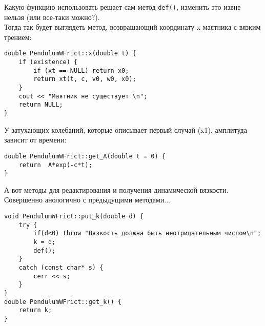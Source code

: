 \documentclass {report}
\begin{document}
Какую функцию использовать решает сам метод \texttt{def()}, изменить это извне нельзя (или все-таки можно?). \\
Тогда так будет выглядеть метод, возвращающий координату x маятника с вязким трением:
\begin{lstlisting}
double PendulumWFrict::x(double t) {
	if (existence) {
		if (xt == NULL) return x0;
		return xt(t, c, v0, w0, x0);
	}
	cout << "Маятник не существует \n";
	return NULL;
}
\end{lstlisting}
У затухающих колебаний, которые описывает первый случай (x1), амплитуда зависит от времени:
\begin{lstlisting}
double PendulumWFrict::get_A(double t = 0) {
	return  A*exp(-c*t);
}
\end{lstlisting} 
А вот методы для редактирования и получения динамической вязкости. Совершенно анологично с предыдущими методами...
\begin{lstlisting}
void PendulumWFrict::put_k(double d) {
	try {
		if(d<0) throw "Вязкость должна быть неотрицательным числом\n";
		k = d;
		def();
	}
	catch (const char* s) {
		cerr << s;
	}
}
double PendulumWFrict::get_k() {
	return k;
}
\end{lstlisting}
\end{document}
